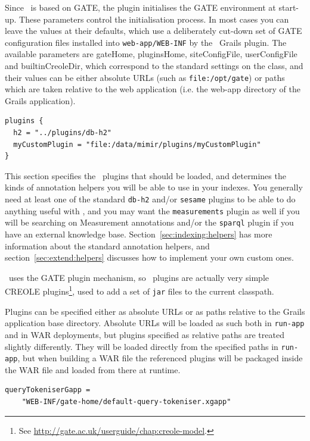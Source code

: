 Since \Mimir\ is based on GATE, the plugin initialises the GATE environment at
start-up.  These parameters control the initialisation process.  In most cases
you can leave the values at their defaults, which use a deliberately cut-down
set of GATE configuration files installed into {\tt web-app/WEB-INF} by the
\Mimir\ Grails plugin.  The available parameters are gateHome, pluginsHome,
siteConfigFile, userConfigFile and builtinCreoleDir, which correspond to the
standard settings on the
class, and their values can be either absolute URLs (such as
\verb|file:/opt/gate|) or paths which are taken relative to the web application
(i.e. the web-app directory of the Grails application).

\begin{lstlisting}
plugins {
  h2 = "../plugins/db-h2"
  myCustomPlugin = "file:/data/mimir/plugins/myCustomPlugin"
}
\end{lstlisting}

This section specifies the \Mimir\ plugins that should be loaded, and
determines the kinds of annotation helpers you will be able to use in your
indexes.  You generally need at least one of the standard {\tt db-h2} and/or
{\tt sesame} plugins to be able to do anything useful with \Mimir, and you may
want the {\tt measurements} plugin as well if you will be searching on
Measurement annotations and/or the {\tt sparql} plugin if you have an external
knowledge base.  Section~\ref{sec:indexing:helpers} has more information about
the standard annotation helpers, and section~\ref{sec:extend:helpers} discusses
how to implement your own custom ones.

\Mimir\ uses the GATE plugin mechanism, so \Mimir\ plugins are actually
very simple CREOLE plugins\footnote{See
\url{http://gate.ac.uk/userguide/chap:creole-model}.}, used to add a set of
{\tt jar} files to the current classpath.
 
Plugins can be specified either as absolute URLs or as paths relative to the
Grails application base directory.  Absolute URLs will be loaded as such both
in {\tt run-app} and in WAR deployments, but plugins specified as relative
paths are treated slightly differently.  They will be loaded directly from the
specified paths in {\tt run-app}, but when building a WAR file the referenced
plugins will be packaged inside the WAR file and loaded from there at runtime.

\begin{lstlisting}
queryTokeniserGapp = 
    "WEB-INF/gate-home/default-query-tokeniser.xgapp"
\end{lstlisting}


